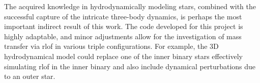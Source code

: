 The acquired knowledge in hydrodynamically modeling stars, combined with the successful capture of the intricate three-body dynamics, is perhaps the most important indirect result of this work. The code developed for this project is highly adaptable, and minor adjustments allow for the investigation of mass transfer via \ac{rlof} in various triple configurations. For example, the 3D hydrodynamical model could replace one of the inner binary stars effectively simulating \ac{rlof} in the inner binary and also include dynamical perturbations due to an outer star. 

